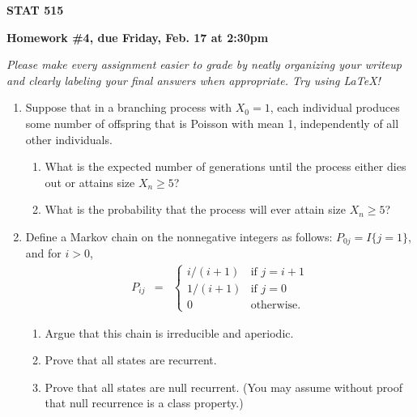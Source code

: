 \documentclass{article}
\begin{document}
\begin{center}
{\bf STAT 515}

{\bf Homework \#4, due Friday, Feb. 17 at 2:30pm}
\end{center}

{\it Please make every assignment easier to grade by neatly organizing your
writeup and clearly labeling your final answers when appropriate. Try using
\LaTeX!}

\begin{enumerate}

\item Suppose that in a branching process with $X_0=1$, each individual produces
some number of offspring that is Poisson with mean 1, independently of all other
individuals.

  \begin{enumerate}

  \item What is the expected number of generations until the process either dies
  out or attains size $X_n\ge 5$?

  \item What is the probability that the process will ever attain size $X_n\ge 5$?  

  \end{enumerate}

\item Define a Markov chain on the nonnegative integers as follows:
$P_{0j}=I\{j=1\}$, and for $i>0$,
\begin{eqnarray*} 
P_{ij}&=& 
  \begin{cases} 
  i/(i+1) & \mbox{if $j=i+1$} \\ 
  1/(i+1) & \mbox{if $j=0$}\\ 0 & \mbox{otherwise.} 
  \end{cases} 
\end{eqnarray*}

  \begin{enumerate}
  
  \item Argue that this chain is irreducible and aperiodic.

  \item Prove that all states are recurrent.

  \item Prove that all states are null recurrent. (You may assume without proof
  that null recurrence is a class property.)

  \end{enumerate}
  

\end{enumerate}
\end{document}
